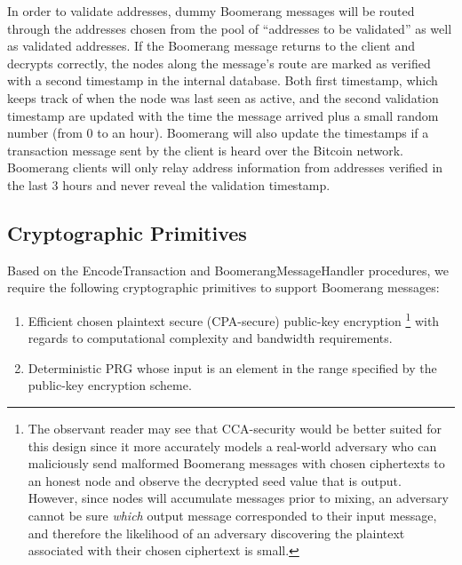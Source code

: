 In order to validate addresses, dummy Boomerang messages will be routed through the addresses chosen from the pool of “addresses to be validated” as well as validated addresses. If the Boomerang message returns to the client and decrypts correctly, the nodes along the message’s route are marked as verified with a second timestamp in the internal database. Both first timestamp, which keeps track of when the node was last seen as active, and the second validation timestamp are updated with the time the message arrived plus a small random number (from 0 to an hour). Boomerang will also update the timestamps if a transaction message sent by the client is heard over the Bitcoin network. Boomerang clients will only relay address information from addresses verified in the last 3 hours and never reveal the validation timestamp.

\subsection{Cryptographic Primitives}

Based on the {\sf EncodeTransaction} and {\sf BoomerangMessageHandler} procedures, we require the following cryptographic primitives to support Boomerang messages:
\begin{enumerate}
	\item Efficient chosen plaintext secure (CPA-secure) public-key encryption \footnote{The observant reader may see that CCA-security would be better suited for this design since it more accurately models a real-world adversary who can maliciously send malformed Boomerang messages with chosen ciphertexts to an honest node and observe the decrypted seed value that is output. However, since nodes will accumulate messages prior to mixing, an adversary cannot be sure \emph{which} output message corresponded to their input message, and therefore the likelihood of an adversary discovering the plaintext associated with their chosen ciphertext is small.} with regards to computational complexity and bandwidth requirements. 
	\item Deterministic PRG whose input is an element in the range specified by the public-key encryption scheme.
\end{enumerate}

